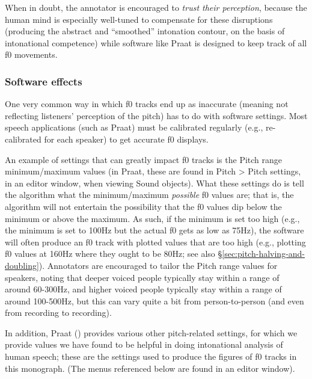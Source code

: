 \documentclass[11pt, twoside]{memoir}
\begin{document}
When in doubt, the annotator is encouraged to \emph{trust their perception}, because the human mind is especially well-tuned to compensate for these disruptions (producing the abstract and “smoothed” intonation contour, on the basis of intonational competence) while software like Praat is designed to keep track of all f0 movements.

\subsubsection{Software effects}\label{sec:software-effects}

One very common way in which f0 tracks end up as inaccurate (meaning not reflecting listeners’ perception of the pitch) has to do with software settings. Most speech applications (such as Praat) must be calibrated regularly (e.g., re-calibrated for each speaker) to get accurate f0 displays.

An example of settings that can greatly impact f0 tracks is the Pitch range minimum\slash maximum values (in Praat, these are found in Pitch > Pitch settings, in an editor window, when viewing Sound objects). What these settings do is tell the algorithm what the minimum\slash maximum \emph{possible} f0 values are; that is, the algorithm will not entertain the possibility that the f0 values dip below the minimum or above the maximum. As such, if the minimum is set too high (e.g., the minimum is set to 100Hz but the actual f0 gets as low as 75Hz), the software will often produce an f0 track with plotted values that are too high (e.g., plotting f0 values at 160Hz where they ought to be 80Hz; see also §\ref{sec:pitch-halving-and-doubling}). Annotators are encouraged to tailor the Pitch range values for speakers, noting that deeper voiced people typically stay within a range of around 60-300Hz, and higher voiced people typically stay within a range of around 100-500Hz, but this can vary quite a bit from person-to-person (and even from recording to recording).

In addition, Praat (\citealt{praat}) provides various other pitch-related settings, for which we provide values we have found to be helpful in doing intonational analysis of human speech; these are the settings used to produce the figures of f0 tracks in this monograph. (The menus referenced below are found in an editor window).
\end{document}
